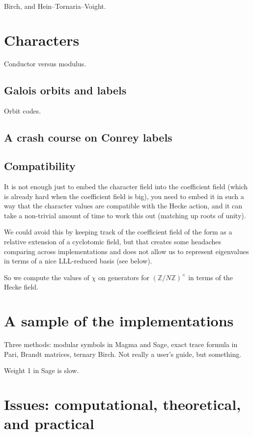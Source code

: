 \documentclass[11pt]{amsart}
\numberwithin{equation}{subsection}
\theoremstyle{plain}
\theoremstyle{definition}
\newcommand{\Z}{\mathbb{Z}}
\begin{document}
Birch, and Hein--Tornaria--Voight.



\section{Characters} \label{sec:chars}

Conductor versus modulus.

\subsection{Galois orbits and labels}

Orbit codes.

\subsection{A crash course on Conrey labels}

\subsection{Compatibility}

It is not enough just to embed the character field into the coefficient field (which is already hard when the coefficient field is big), you need to embed it in such a way that the character values are compatible with the Hecke action, and it can take a non-trivial amount of time to work this out (matching up roots of unity).

We could avoid this by keeping track of the coefficient field of the form as a relative extension of a cyclotomic field, but that creates some headaches comparing across implementations and does not allow us to represent eigenvalues in terms of a nice LLL-reduced basis (see below).  

So we compute the values of $\chi$ on generators for $(\Z/N\Z)^\times$ in terms of the Hecke field.

\section{A sample of the implementations} \label{sec:implementations}

Three methods: modular symbols in Magma and Sage, exact trace formula in Pari, Brandt matrices, ternary Birch.  Not really a user's guide, but something.  

Weight 1 in Sage is slow.  

\section{Issues: computational, theoretical, and practical} \label{sec:issues}
\end{document}
